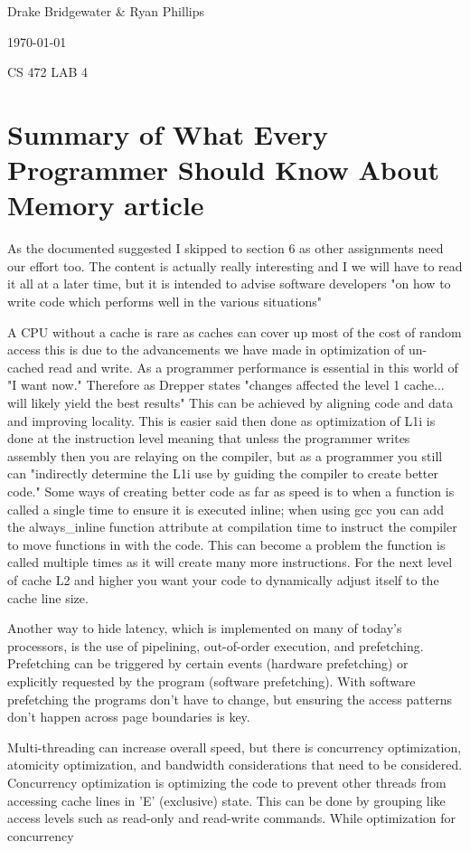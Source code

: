 \documentclass[letterpaper,12pt,titlepage]{article}
\def\name{Drake Bridgewater \& Ryan Phillips}
\begin{document}
\hfill \name

\hfill \today

\hfill CS 472 LAB 4

\section*{Summary of What Every Programmer Should Know About Memory article}
As the documented suggested I skipped to section 6 as other assignments need our effort too. The content is actually really interesting and I we will have to read it all at a later time, but it is intended to advise software developers "on how to write code which performs well in the various situations" \cite[p.~2]{Drepper}

A CPU without a cache is rare as caches can cover up most of the cost of random access this is due to the advancements we have made in optimization of un-cached read and write. As a programmer performance is essential in this world of "I want now." Therefore as Drepper states "changes affected the level 1 cache... will likely yield the best results" \cite[p.~49]{Drepper} This can be achieved by aligning code and data and improving locality. This is easier said then done as optimization of L1i is done at the instruction level meaning that unless the programmer writes assembly then you are relaying on the compiler, but as a programmer you still can "indirectly determine the L1i use by guiding the compiler to create better code." \cite[p.~55]{Drepper} Some ways of creating better code as far as speed is to when a function is called a single time to ensure it is executed inline; when using gcc you can add the always\_inline function attribute at compilation time to instruct the compiler to move functions in with the code. This can become a problem the function is called multiple times as it will create many more instructions. For the next level of cache L2 and higher you want your code to dynamically adjust itself to the cache line size.

Another way to hide latency, which is implemented on many of today's processors, is the use of pipelining, out-of-order execution, and prefetching. Prefetching can be triggered by certain
events (hardware prefetching) or explicitly requested by the program (software prefetching). \cite[p.~61]{Drepper} With software prefetching the programs don't have to change, but ensuring the access patterns don't happen across page boundaries is key.

Multi-threading can increase overall speed, but there is concurrency optimization, atomicity optimization, and bandwidth considerations that need to be considered. Concurrency optimization is optimizing the code to prevent other threads from accessing  cache lines in 'E' (exclusive) state. This can be done by grouping like access levels such as read-only and read-write commands. While optimization for concurrency
\end{document}
